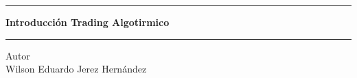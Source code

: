 \pagestyle{empty}
\begin{center}
\begin{figure}[h]
\centering


\end{figure}
\Large
\hrule
\vspace{4mm}
\textbf{Introducción Trading Algotirmico}\\

\vspace{4mm}
\hrule
\large
\vfill
Autor\\

Wilson Eduardo Jerez Hernández \\

\end{center}
\newpage
